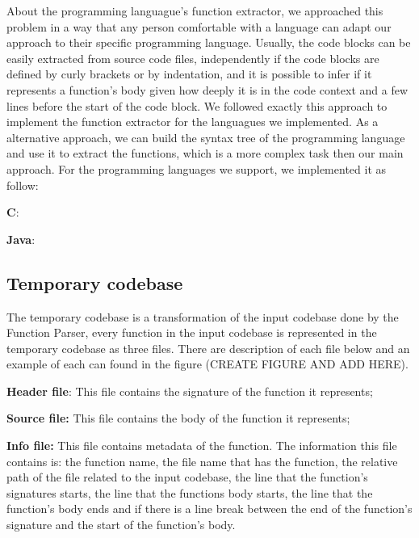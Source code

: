 About the programming languague's function extractor, we approached this problem in a way that any person comfortable with a language
can adapt our approach to their specific programming language. Usually, the code blocks can be easily extracted from 
source code files, independently if the code blocks are defined by curly brackets or by indentation, and it is possible to
infer if it represents a function's body given how deeply it is in the code context and a few lines before the start 
of the code block. We followed exactly this approach to implement the function extractor for the languagues we implemented. 
As a alternative approach, we can build the syntax tree \citep{compiler} of the programming language and use it to 
extract the functions, which is a more complex task then our main approach. For the programming languages we support, we implemented
it as follow:

\begin{itemize}
	\begin{item}
		\textbf{C}:
	\end{item}
	\begin{item}
		\textbf{Java}:
	\end{item}
\end{itemize}

\subsection{Temporary codebase}

The temporary codebase is a transformation of the input codebase done by the Function Parser, every function in the input codebase
is represented in the temporary codebase as three files. There are description of each file below and an example of each can found
in the figure (CREATE FIGURE AND ADD HERE).

\begin{itemize}
	\begin{item}
		\textbf{Header file}: This file contains the signature of the function it represents;
	\end{item}
	\begin{item}
		\textbf{Source file:} This file contains the body of the function it represents;
	\end{item}
	\begin{item}
		\textbf{Info file:} This file contains metadata of the function. The information this file contains is:
		the function name, the file name that has the function, the relative path of the file related to the input codebase, 
		the line that the function's signatures starts, the line that the functions body starts, the line that the function's body 
		ends and if there is a line break between the end of the function's signature and the start of the function's body.
		
	\end{item}
\end{itemize}

